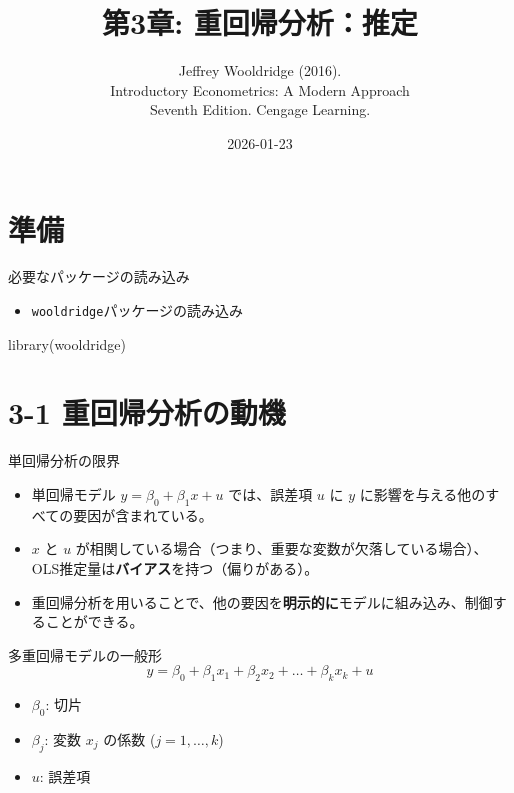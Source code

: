 \documentclass[
  ignorenonframetext,
]{beamer}
\title{第3章: 重回帰分析：推定}
\subtitle{Jeffrey Wooldridge (2016).\\
Introductory Econometrics: A Modern Approach\\
Seventh Edition. Cengage Learning.}
\author{}
\date{\vspace{-2.5em}2026-01-23}
\newenvironment{Shaded}{\begin{snugshade}}{\end{snugshade}}
\newcommand{\FunctionTok}[1]{\textcolor[rgb]{0.00,0.00,0.00}{#1}}
\newcommand{\NormalTok}[1]{#1}
\providecommand{\tightlist}{%
  \setlength{\itemsep}{0pt}\setlength{\parskip}{0pt}}
\begin{document}
\frame{\titlepage}

\hypertarget{ux6e96ux5099}{%
\section{準備}\label{ux6e96ux5099}}

\begin{frame}[fragile]{必要なパッケージの読み込み}
\protect\hypertarget{ux5fc5ux8981ux306aux30d1ux30c3ux30b1ux30fcux30b8ux306eux8aadux307fux8fbcux307f}{}
\begin{itemize}
\tightlist
\item
  \texttt{wooldridge}パッケージの読み込み
\end{itemize}

\begin{Shaded}
\begin{Highlighting}[]
\FunctionTok{library}\NormalTok{(wooldridge)}
\end{Highlighting}
\end{Shaded}
\end{frame}

\hypertarget{ux91cdux56deux5e30ux5206ux6790ux306eux52d5ux6a5f}{%
\section{3-1
重回帰分析の動機}\label{ux91cdux56deux5e30ux5206ux6790ux306eux52d5ux6a5f}}

\begin{frame}{単回帰分析の限界}
\protect\hypertarget{ux5358ux56deux5e30ux5206ux6790ux306eux9650ux754c}{}
\begin{itemize}
\tightlist
\item
  単回帰モデル \(y = \beta_0 + \beta_1 x + u\) では、誤差項 \(u\) に
  \(y\) に影響を与える他のすべての要因が含まれている。
\item
  \(x\) と \(u\)
  が相関している場合（つまり、重要な変数が欠落している場合）、OLS推定量は\textbf{バイアス}を持つ（偏りがある）。
\item
  重回帰分析を用いることで、他の要因を\textbf{明示的に}モデルに組み込み、制御することができる。
\end{itemize}
\end{frame}

\begin{frame}{多重回帰モデルの一般形}
\protect\hypertarget{ux591aux91cdux56deux5e30ux30e2ux30c7ux30ebux306eux4e00ux822cux5f62}{}
\[ y = \beta_0 + \beta_1 x_1 + \beta_2 x_2 + \dots + \beta_k x_k + u \]

\begin{itemize}
\tightlist
\item
  \(\beta_0\): 切片
\item
  \(\beta_j\): 変数 \(x_j\) の係数 (\(j=1, \dots, k\))
\item
  \(u\): 誤差項
\end{itemize}
\end{frame}
\end{document}
